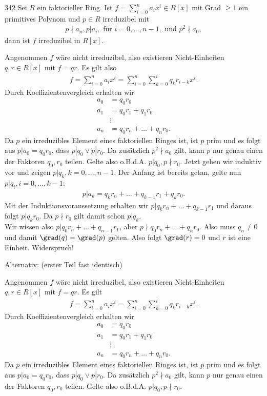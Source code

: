 \begin{algebraUE}{342}
Sei $R$ ein faktorieller Ring. Ist $f = \sum_{i=0}^na_ix^i \in R[x]$ mit Grad $\geq 1$
ein primitives Polynom und $p \in R$ irreduzibel mit
\begin{align*}
  p \nmid a_n, p | a_i, \text{ für } i = 0,\dots,n-1, \text{ und } p^2 \nmid a_0,
\end{align*}
dann ist $f$ irreduzibel in $R[x]$.
\end{algebraUE}

\begin{solution}
Angenommen $f$ wäre nicht irreduzibel, also existieren Nicht-Einheiten $q,r \in R[x]$ mit $f = qr$.
Es gilt also
\begin{align*}
  f = \sum_{i=0}^na_ix^i = \sum_{i = 0}^n \sum_{k= 0}^i q_kr_{i-k}x^i.
\end{align*}
Durch Koeffizientenvergleich erhalten wir
\begin{align*}
  a_0 &= q_0r_0 \\
  a_1 &= q_0r_1 + q_1r_0 \\
  &\vdots \\
  a_n &= q_0r_n + \dots + q_nr_0.
\end{align*}
Da $p$ ein irreduzibles Element eines faktoriellen Ringes ist, ist $p$ prim und es folgt
aus $p| a_0 = q_0r_0$, dass $p|q_0 \lor p|r_0$. Da zusätzlich $p^2 \nmid a_0$ gilt,
kann $p$ nur genau einen der Faktoren $q_0,r_0$ teilen. Gelte also o.B.d.A. $p | q_0, p \nmid r_0$.
Jetzt gehen wir induktiv vor und zeigen $p | q_k, k = 0,\dots,n-1$. Der Anfang ist bereits getan,
gelte nun $p | q_{i}, i = 0,\dots,k-1$:
\begin{align*}
  p | a_k = q_kr_n + \dots + q_{k-1}r_1 + q_kr_0.
\end{align*}
Mit der Induktionsvoraussetzung erhalten wir $p | q_kr_n + \dots + q_{k-1}r_1$
und daraus folgt $p | q_kr_0$. Da $p \nmid r_0$ gilt damit schon $p | q_k$. \\
Wir wissen also $p | q_0r_n + \dots + q_{n-1}r_1$, aber $p \nmid q_0r_n + \dots + q_nr_0$.
Also muss $q_n \neq 0$ und damit $\grad(q) = \grad(p)$ gelten. Also folgt $\grad(r) = 0$
und $r$ ist eine Einheit. Widerspruch!

Alternativ: (erster Teil fast identisch)

Angenommen $f$ wäre nicht irreduzibel, also existieren Nicht-Einheiten $q,r \in R[x]$ mit $f = qr$.
Es gilt
\begin{align*}
  f = \sum_{i=0}^na_ix^i = \sum_{i = 0}^n \sum_{k= 0}^i q_kr_{i-k}x^i.
\end{align*}
Durch Koeffizientenvergleich erhalten wir
\begin{align*}
  a_0 &= q_0r_0 \\
  a_1 &= q_0r_1 + q_1r_0 \\
  &\vdots \\
  a_n &= q_0r_n + \dots + q_nr_0.
\end{align*}
Da $p$ ein irreduzibles Element eines faktoriellen Ringes ist, ist $p$ prim und es folgt
aus $p| a_0 = q_0r_0$, dass $p|q_0 \lor p|r_0$. Da zusätzlich $p^2 \nmid a_0$ gilt,
kann $p$ nur genau einen der Faktoren $q_0,r_0$ teilen. Gelte also o.B.d.A. $p | q_0, p \nmid r_0$.


\end{solution}
